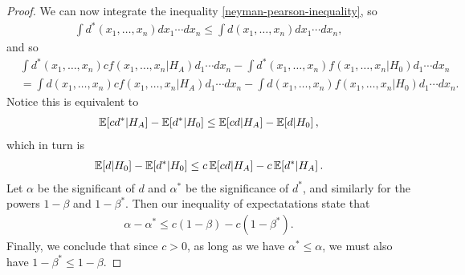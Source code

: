 \begin{proof}
    We can now integrate the inequality \ref{neyman-pearson-inequality}, so
    \begin{align*}
        \int d^{*}(x_1, \ldots, x_n)dx_1\cdots dx_n \leq \int d(x_1, \ldots, x_n)dx_1\cdots dx_n,
    \end{align*}
    and so
    \begin{align*}
        &\int d^{*}(x_1, \ldots, x_n)cf(x_1, \ldots, x_n|H_A)d_1\cdots dx_n - \int d^{*}(x_1, \ldots, x_n)f(x_1, \ldots, x_n|H_0)d_1\cdots dx_n \\
        &= \int d(x_1, \ldots, x_n)cf(x_1, \ldots, x_n|H_A)d_1\cdots dx_n - \int d(x_1, \ldots, x_n)f(x_1, \ldots, x_n|H_0)d_1\cdots dx_n.
    \end{align*}
    Notice this is equivalent to
    \begin{align*}
        \operatorname{\mathbb{E}}\!\left[{cd^{*}|H_A}\right] - \operatorname{\mathbb{E}}\!\left[{d^{*}|H_0}\right] \leq \operatorname{\mathbb{E}}\!\left[{cd|H_A}\right] - \operatorname{\mathbb{E}}\!\left[{d|H_0}\right],
    \end{align*}
    which in turn is
    \begin{align*}
        \operatorname{\mathbb{E}}\!\left[{d|H_0}\right]  - \operatorname{\mathbb{E}}\!\left[{d^{*}|H_0}\right] \leq c\operatorname{\mathbb{E}}\!\left[{cd|H_A}\right] - c\operatorname{\mathbb{E}}\!\left[{d^{*}|H_A}\right].
    \end{align*}
    Let $\alpha$ be the significant of $d$ and $\alpha^{*}$ be the significance of $d^{*}$, and similarly for the powers $1 - \beta$ and $1 - \beta^{*}$. Then our inequality of expectatations state that
    \begin{align*}
        \alpha - \alpha^{*} \leq c(1 - \beta) - c(1 - \beta^{*}).
    \end{align*}
    Finally, we conclude that since $c > 0$, as long as we have $\alpha^{*} \leq \alpha$, we must also have $1 - \beta^{*} \leq 1 - \beta$.
\end{proof}

